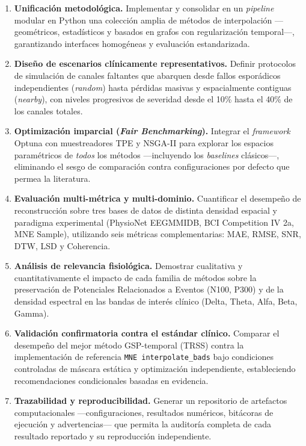 \begin{enumerate}
    \item \textbf{Unificación metodológica.} Implementar y consolidar en un \textit{pipeline} modular en Python una colección amplia de métodos de interpolación —geométricos, estadísticos y basados en grafos con regularización temporal—, garantizando interfaces homogéneas y evaluación estandarizada.

    \item \textbf{Diseño de escenarios clínicamente representativos.} Definir protocolos de simulación de canales faltantes que abarquen desde fallos esporádicos independientes (\textit{random}) hasta pérdidas masivas y espacialmente contiguas (\textit{nearby}), con niveles progresivos de severidad desde el 10\% hasta el 40\% de los canales totales.

    \item \textbf{Optimización imparcial (\textit{Fair Benchmarking}).} Integrar el \textit{framework} Optuna con muestreadores TPE y NSGA-II para explorar los espacios paramétricos de \textit{todos} los métodos —incluyendo los \textit{baselines} clásicos—, eliminando el sesgo de comparación contra configuraciones por defecto que permea la literatura.

    \item \textbf{Evaluación multi-métrica y multi-dominio.} Cuantificar el desempeño de reconstrucción sobre tres bases de datos de distinta densidad espacial y paradigma experimental (PhysioNet EEGMMIDB, BCI Competition IV 2a, MNE Sample), utilizando seis métricas complementarias: MAE, RMSE, SNR, DTW, LSD y Coherencia.

    \item \textbf{Análisis de relevancia fisiológica.} Demostrar cualitativa y cuantitativamente el impacto de cada familia de métodos sobre la preservación de Potenciales Relacionados a Eventos (N100, P300) y de la densidad espectral en las bandas de interés clínico (Delta, Theta, Alfa, Beta, Gamma).

    \item \textbf{Validación confirmatoria contra el estándar clínico.} Comparar el desempeño del mejor método GSP-temporal (TRSS) contra la implementación de referencia \texttt{MNE interpolate\_bads} bajo condiciones controladas de máscara estática y optimización independiente, estableciendo recomendaciones condicionales basadas en evidencia.

    \item \textbf{Trazabilidad y reproducibilidad.} Generar un repositorio de artefactos computacionales —configuraciones, resultados numéricos, bitácoras de ejecución y advertencias— que permita la auditoría completa de cada resultado reportado y su reproducción independiente.
\end{enumerate}

